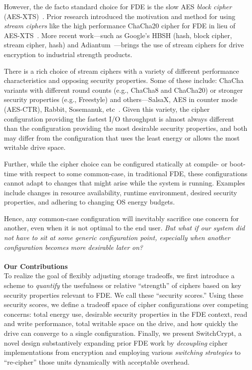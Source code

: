 However, the de facto standard choice for FDE is the slow AES \emph{block
cipher} (AES-XTS)~\cite{AES, AES-XTS}. Prior research introduced the motivation
and method for using \emph{stream ciphers} like the high performance ChaCha20
cipher for FDE in lieu of AES-XTS~\cite{StrongBox, ChaCha20}. More recent
work---such as Google's HBSH (hash, block cipher, stream cipher, hash) and
Adiantum~\cite{HBSH, Adiantum}---brings the use of stream ciphers for drive
encryption to industrial strength products.

There is a rich choice of stream ciphers with a variety of different performance
characteristics and opposing security properties. Some of these include: ChaCha
variants with different round counts (e.g., ChaCha8 and ChaCha20) or stronger
security properties (e.g., Freestyle) and others---SalsaX, AES in counter mode
(AES-CTR), Rabbit, Sosemanuk, etc~\cite{Freestyle, SalsaX, Rabbit, Sosemanuk,
ChaCha20, AES-CTR}. Given this variety, the cipher configuration providing the
fastest I/O throughput is almost always different than the configuration
providing the most desirable security properties, and both may differ from the
configuration that uses the least energy or allows the most writable
drive space.

Further, while the cipher choice can be configured statically at compile- or
boot-time with respect to some common-case, in traditional FDE, these
configurations cannot adapt to changes that might arise while the system is
running. Examples include changes in resource availability, runtime environment,
desired security properties, and adhering to changing OS energy budgets.

Hence, any common-case configuration will inevitably sacrifice one concern for
another, even when it is not optimal to the end user. \emph{But what if our
system did not have to sit at some generic configuration point, especially when
another configuration becomes more desirable later on?}\\
\\
\textbf{Our Contributions}\\
To realize the goal of flexibly adjusting storage tradeoffs, we first introduce
a scheme to \emph{quantify} the usefulness or relative ``strength'' of ciphers
based on key security properties relevant to FDE. We call these ``security
scores.'' Using these security scores, we define a tradeoff space of cipher
configurations over competing concerns: total energy use, desirable security
properties in the FDE context, read and write performance, total writable space
on the drive, and how quickly the drive can converge to a single configuration.
Finally, we present SwitchCrypt, a novel design substantively expanding prior
FDE work by \emph{decoupling} cipher implementations from encryption and
employing various \emph{switching strategies} to ``re-cipher'' those units
dynamically with acceptable overhead. 

